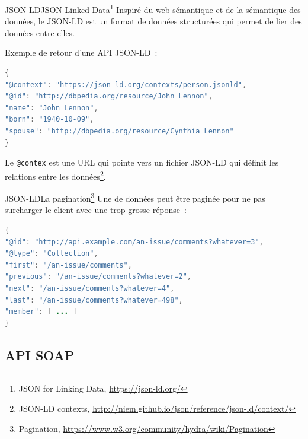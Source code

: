 \documentclass{beamer}
\begin{document}
    \begin{frame}[fragile]{JSON-LD}{JSON Linked-Data\footnote{JSON for Linking Data, \url{https://json-ld.org/}}}
        Inspiré du web sémantique et de la sémantique des données, le JSON-LD est un format de données structurées qui permet de lier des données entre elles.

        \bigbreak
        Exemple de retour d'une API JSON-LD~:
        \begin{lstlisting}[language=java,basicstyle=\ttfamily\tiny]
{
"@context": "https://json-ld.org/contexts/person.jsonld",
"@id": "http://dbpedia.org/resource/John_Lennon",
"name": "John Lennon",
"born": "1940-10-09",
"spouse": "http://dbpedia.org/resource/Cynthia_Lennon"
}
        \end{lstlisting}
        Le \lstinline{@contex} est une URL qui pointe vers un fichier JSON-LD qui définit les relations entre les données\footnote{JSON-LD contexts, \url{http://niem.github.io/json/reference/json-ld/context/}}.
    \end{frame}

    \begin{frame}[fragile]{JSON-LD}{La pagination\footnote{Pagination, \url{https://www.w3.org/community/hydra/wiki/Pagination}}}
        Une  de données peut être paginée pour ne pas surcharger le client avec une trop grosse réponse~:
        \begin{lstlisting}[language=java]
{
"@id": "http://api.example.com/an-issue/comments?whatever=3",
"@type": "Collection",
"first": "/an-issue/comments",
"previous": "/an-issue/comments?whatever=2",
"next": "/an-issue/comments?whatever=4",
"last": "/an-issue/comments?whatever=498",
"member": [ ... ]
}
        \end{lstlisting}
    \end{frame}

    \subsection{API SOAP}\label{subsec:api-soap}
\end{document}
